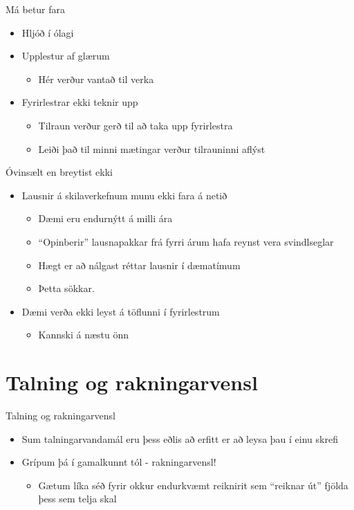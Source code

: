 \documentclass{beamer}
\begin{document}
\begin{frame}{Má betur fara}
\begin{itemize}
 \item Hljóð í ólagi
 \item Upplestur af glærum \pause
 \begin{itemize}
  \item Hér verður vantað til verka
 \end{itemize}
 \item Fyrirlestrar ekki teknir upp
 \begin{itemize}
  \item Tilraun verður gerð til að taka upp fyrirlestra
  \item Leiði það til minni mætingar verður tilrauninni aflýst
 \end{itemize}
\end{itemize}
\end{frame}

\begin{frame}{Óvinsælt en breytist ekki}
\begin{itemize}
 \item Lausnir á skilaverkefnum munu ekki fara á netið
 \begin{itemize}
  \item Dæmi eru endurnýtt á milli ára
  \item ``Opinberir'' lausnapakkar frá fyrri árum hafa reynst vera svindlseglar
  \item Hægt er að nálgast réttar lausnir í dæmatímum
  \item Þetta sökkar.
 \end{itemize}
 \item Dæmi verða ekki leyst á töflunni í fyrirlestrum
 \begin{itemize}
  \item Kannski á næstu önn
 \end{itemize}
\end{itemize}
\end{frame}

\section{Talning og rakningarvensl}

\begin{frame}{Talning og rakningarvensl}
\begin{itemize}
 \item Sum talningarvandamál eru þess eðlis að erfitt er að leysa þau í einu skrefi
 \item Grípum þá í gamalkunnt tól - rakningarvensl!
 \begin{itemize}
  \item Gætum líka séð fyrir okkur endurkvæmt reiknirit sem ``reiknar út'' fjölda þess sem telja skal
 \end{itemize}
\end{itemize}
\end{frame}
\end{document}
